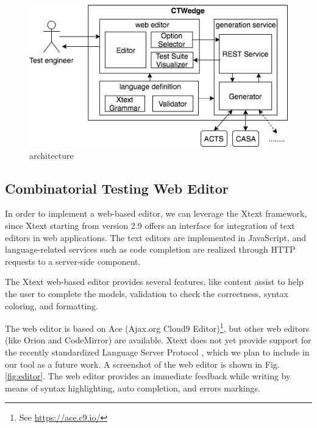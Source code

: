 \begin{tikzborder}{\cite{Gargantini16:validation}}
\begin{tikzborder}{\cite{gargantini_combinatorial_2017}}
\begin{tikzborder}{\cite{garn2019}}
\begin{tikzborder}{\cite{arcaini2019achieving}}
\begin{figure}[bt!]
	\centering
	\includegraphics[width=.8\columnwidth]{images/architecture.png}
	\caption{\ctwedge architecture}\label{fig:architecture}
\end{figure}

\subsection{Combinatorial Testing Web Editor}

\begin{tikzborder}{}
In order to implement a web-based editor, we can leverage the Xtext framework, since Xtext starting from version 2.9 offers an interface for integration of text editors in web applications. The text editors are implemented in JavaScript, and language-related services such as code completion are realized through HTTP requests to a server-side component.

The Xtext web-based editor provides several features, like content assist to help the user to complete the models, validation to check the correctness, syntax coloring, and formatting.

The \ctwedge web editor is based on Ace (Ajax.org Cloud9 Editor)\footnote{See \url{https://ace.c9.io/}}, but other web editors (like Orion and CodeMirror) are available. Xtext does not yet provide support for the recently standardized Language Server Protocol \cite{lsp}, which we plan to include in our tool as a future work.  A screenshot of the \ctwedge web editor is shown in Fig. \ref{fig:editor}. The web editor provides an immediate feedback while writing by means of syntax highlighting, auto completion, and errors markings. 


\end{tikzborder}
\end{tikzborder}
\end{tikzborder}
\end{tikzborder}
\end{tikzborder}
